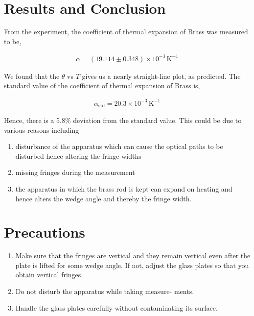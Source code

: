 \section{Results and Conclusion}

From the experiment, the coefficient of thermal expansion of Brass was measured to be,

\begin{align*}
    \alpha = (19.114 \pm 0.348) \times 10^{-3}\,\text{K}^{-1}
\end{align*}

We found that the $\theta$ vs $T$ gives us a nearly straight-line
plot, as predicted. The standard value of the coefficient of thermal expansion of Brass is,

\begin{align*}
    \alpha_\text{std} = 20.3 \times 10^{-3}\,\text{K}^{-1}
\end{align*}

Hence, there is a 5.8\% deviation from the standard value. This could be due to various reasons including 

\begin{enumerate}[label=(\roman*)]
    \item disturbance of the apparatus which can cause the
    optical paths to be disturbed hence altering the
    fringe widths
    \item missing fringes during the measurement
    \item the apparatus in which the brass rod is kept can
    expand on heating and hence alters the wedge angle
    and thereby the fringe width.
\end{enumerate}

\section{Precautions}

\begin{enumerate}
    \item Make sure that the fringes are vertical and they remain
    vertical even after the plate is lifted for some wedge angle.
    If not, adjust the glass plates so that you obtain
    vertical fringes.
    \item Do not disturb the apparatus while taking measure-
    ments.
    \item Handle the glass plates carefully without contaminating
    its surface.
\end{enumerate}